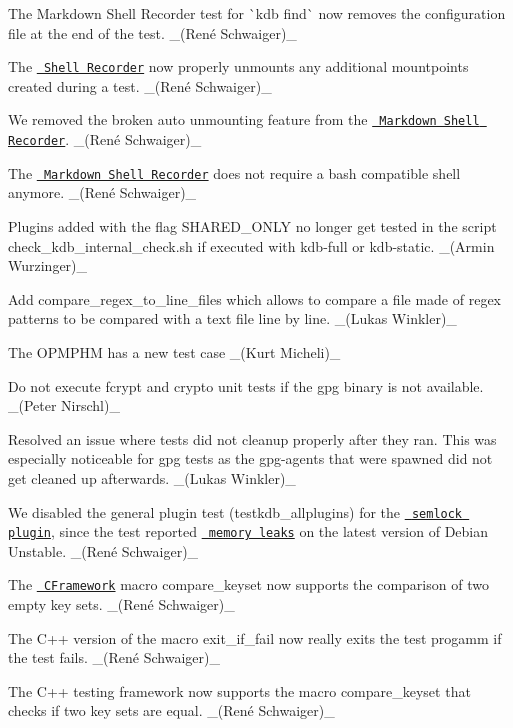 \begin{DoxyItemize}
\item The Markdown Shell Recorder test for \`{}kdb find\`{} now removes the configuration file at the end of the test. \+\_\+(René Schwaiger)\+\_\+
\item The \href{(https://master.libelektra.org/tests/shell/shell_recorder)}{\texttt{ Shell Recorder}} now properly unmounts any additional mountpoints created during a test. \+\_\+(René Schwaiger)\+\_\+
\item We removed the broken auto unmounting feature from the \href{https://master.libelektra.org/tests/shell/shell_recorder/tutorial_wrapper}{\texttt{ Markdown Shell Recorder}}. \+\_\+(René Schwaiger)\+\_\+
\item The \href{https://master.libelektra.org/tests/shell/shell_recorder/tutorial_wrapper}{\texttt{ Markdown Shell Recorder}} does not require a {\ttfamily bash} compatible shell anymore. \+\_\+(René Schwaiger)\+\_\+
\end{DoxyItemize}


\begin{DoxyItemize}
\item Plugins added with the flag {\ttfamily S\+H\+A\+R\+E\+D\+\_\+\+O\+N\+LY} no longer get tested in the script {\ttfamily check\+\_\+kdb\+\_\+internal\+\_\+check.\+sh} if executed with kdb-\/full or kdb-\/static. \+\_\+(\+Armin Wurzinger)\+\_\+
\item Add {\ttfamily compare\+\_\+regex\+\_\+to\+\_\+line\+\_\+files} which allows to compare a file made of regex patterns to be compared with a text file line by line. \+\_\+(\+Lukas Winkler)\+\_\+
\item The O\+P\+M\+P\+HM has a new test case \+\_\+(\+Kurt Micheli)\+\_\+
\item Do not execute {\ttfamily fcrypt} and {\ttfamily crypto} unit tests if the {\ttfamily gpg} binary is not available. \+\_\+(\+Peter Nirschl)\+\_\+
\item Resolved an issue where tests did not cleanup properly after they ran. This was especially noticeable for {\ttfamily gpg} tests as the {\ttfamily gpg-\/agents} that were spawned did not get cleaned up afterwards. \+\_\+(\+Lukas Winkler)\+\_\+
\item We disabled the general plugin test ({\ttfamily testkdb\+\_\+allplugins}) for the \href{https://libelektra.org/plugins/mini}{\texttt{ {\ttfamily semlock} plugin}}, since the test reported \href{https://issues.libelektra.org/2113}{\texttt{ memory leaks}} on the latest version of Debian Unstable. \+\_\+(René Schwaiger)\+\_\+
\item The \href{https://master.libelektra.org/tests/cframework}{\texttt{ C\+Framework}} macro {\ttfamily compare\+\_\+keyset} now supports the comparison of two empty key sets. \+\_\+(René Schwaiger)\+\_\+
\item The C++ version of the macro {\ttfamily exit\+\_\+if\+\_\+fail} now really exits the test progamm if the test fails. \+\_\+(René Schwaiger)\+\_\+
\item The C++ testing framework now supports the macro {\ttfamily compare\+\_\+keyset} that checks if two key sets are equal. \+\_\+(René Schwaiger)\+\_\+
\end{DoxyItemize}

